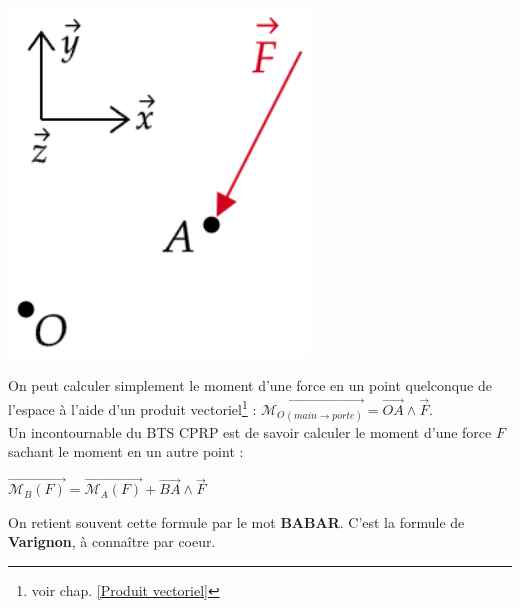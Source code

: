 \documentclass[
	11pt, %
	fleqn, %
	a4paper, %
]{LegrandOrangeBook}
\begin{document}
\noindent \begin{minipage}{0.5\textwidth}
\vspace{1cm}
\includegraphics[width=0.6\textwidth]{Images/Moment2.png}
\label{Moment2}
\end{minipage}
\hspace{0.05\textwidth}
\begin{minipage}{0.4\textwidth}

\begin{theorem}
On peut calculer simplement le moment d’une force en un point quelconque de l’espace à l’aide d’un
produit vectoriel\footnote{voir chap. \ref{Produit vectoriel}} : $\overrightarrow{\mathcal{M}_{O}{}_{\left( main\rightarrow porte\right)}}=\overrightarrow{OA} \land \Vec{F} $. \\

Un incontournable du BTS CPRP est de savoir calculer le moment d'une force $F$ sachant le moment en un autre point : 

$\overrightarrow{\mathcal{M}_{B}{(F)}}= \overrightarrow{\mathcal{M}_{A}{(F)}} + \overrightarrow{BA} \land \Vec{F}$

On retient souvent cette formule par le mot \textbf{BABAR}. C'est la formule de \textbf{Varignon}, à connaître par coeur.
\end{theorem}
\end{minipage}
\end{document}

